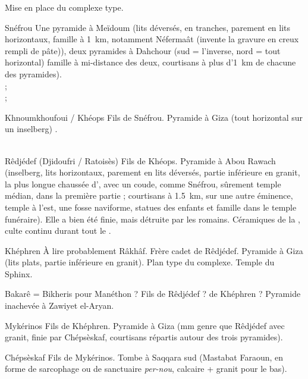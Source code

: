 Mise en place du complexe type.
                  
\begin{listerois}
  \item [Snéfrou] Une pyramide à Meïdoum (lits déversés, en tranches, 
        parement en lits horizontaux, famille à \SI{1}{\km}, notamment 
        Néfermaât (invente la gravure en creux rempli de pâte)), deux 
        pyramides à Dahchour (sud = l'inverse, nord = tout horizontal) 
        famille à mi-distance des deux, courtisans à plus 
        d'\SI{1}{\km} de chacune des pyramides). \\
         ; \\
         ; \\
  \item [Khnoumkhoufoui / Khéops] Fils de Snéfrou. Pyramide à Giza 
        (tout horizontal sur un inselberg) . \\
         \\
  \item [Rêdjédef (Djidoufri / Ratoisès)] Fils de Khéops. 
        Pyramide à Abou Rawach (inselberg, lits horizontaux, parement 
        en lits déversés, partie inférieure en granit, la plus longue 
        chaussée d'\kmt, avec un coude, comme Snéfrou, sûrement temple 
        médian, dans la première partie ;
        courtisans à \SI{1.5}{\km}, sur une autre éminence, temple à 
        l'est, une fosse naviforme, statues des enfants et famille 
        dans le temple funéraire).
        Elle a bien été finie, mais détruite par les romains. 
        Céramiques de la , culte continu durant tout le \MK.
  \item [Khéphren] À lire probablement Râkhâf. Frère cadet de 
        Rêdjédef. Pyramide à Giza (lits plats, partie inférieure en 
        granit). Plan type du complexe. Temple du Sphinx.
  \item [Bakarê] = Bikheris pour Manéthon ? Fils de Rêdjédef ? 
        de Khéphren ? 
        Pyramide inachevée à Zawiyet el-Aryan.
  \item [Mykérinos] Fils de Khéphren. Pyramide à Giza (mm genre que 
        Rêdjédef avec granit, finie par Chépsèskaf, courtisans 
        répartis autour des trois pyramides).
  \item [Chépsèskaf] Fils de Mykérinos. Tombe à Saqqara sud 
        (Mastabat Faraoun, en forme de sarcophage ou de sanctuaire 
        \emph{per-nou}, calcaire + granit pour le bas). \\
\end{listerois}

